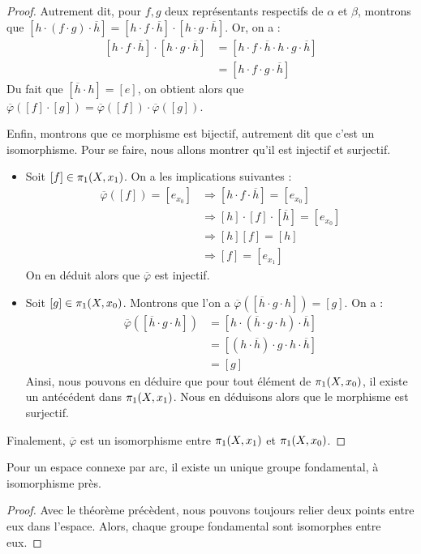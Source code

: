 \documentclass[hidelinks, 10pt]{article}
\begin{document}
\begin{proof}
Autrement dit, pour $f,g$ deux représentants respectifs de $\alpha$ et $\beta$, montrons que $[h\cdot(f\cdot g)\cdot\overline{h}]=[h\cdot f\cdot\overline{h}]\cdot[h\cdot g\cdot\overline{h}]$. Or, on a : \[\begin{split}
[h\cdot f\cdot\overline{h}]\cdot[h\cdot g\cdot\overline{h}]&=[h\cdot f\cdot\overline{h}\cdot h\cdot g\cdot\overline{h}]\\
&=[h\cdot f\cdot g\cdot\overline{h}]\quad
\end{split}\]Du fait que $[\overline{h}\cdot h]=[e]$, on obtient alors que $\overline{\varphi}([f]\cdot[g])=\overline{\varphi}([f])\cdot\overline{\varphi}([g])$.

Enfin, montrons que ce morphisme est bijectif, autrement dit que c'est un isomorphisme. Pour se faire, nous allons montrer qu'il est injectif et surjectif.\begin{itemize}
    \item Soit $[f]\in\pi_1(X,x_1)$. On a les implications suivantes : \[\begin{split}
        \overline{\varphi}([f])=[e_{x_0}]&\Longrightarrow [h\cdot f\cdot\overline{h}]=[e_{x_0}]\\
        &\Longrightarrow [h]\cdot[f]\cdot[\overline{h}]=[e_{x_0}]\\
        &\Longrightarrow [h][f]=[h]\\
        &\Longrightarrow [f]=[e_{x_1}]
    \end{split}\]On en déduit alors que $\overline{\varphi}$ est injectif.
    \item Soit $[g]\in\pi_1(X,x_0)$. Montrons que l'on a $\overline{\varphi}([\overline{h}\cdot g\cdot h])=[g]$. On a : \[\begin{split}
        \overline{\varphi}([\overline{h}\cdot g\cdot h])&=[h\cdot(\overline{h}\cdot g\cdot h)\cdot\overline{h}]\\
        &=[(h\cdot\overline{h})\cdot g\cdot h\cdot\overline{h}]\\
        &=[g]
    \end{split}\]Ainsi, nous pouvons en déduire que pour tout élément de $\pi_1(X,x_0)$, il existe un antécédent dans $\pi_1(X,x_1)$. Nous en déduisons alors que le morphisme est surjectif.
\end{itemize}
Finalement, $\overline{\varphi}$ est un isomorphisme entre $\pi_1(X,x_1)$ et $\pi_1(X,x_0)$.
\end{proof}

\begin{corollary}
Pour un espace connexe par arc, il existe un unique groupe fondamental, à isomorphisme près.
\end{corollary}
\begin{proof}
Avec le théorème précèdent, nous pouvons toujours relier deux points entre eux dans l'espace. Alors, chaque groupe fondamental sont isomorphes entre eux.
\end{proof}
\end{document}
